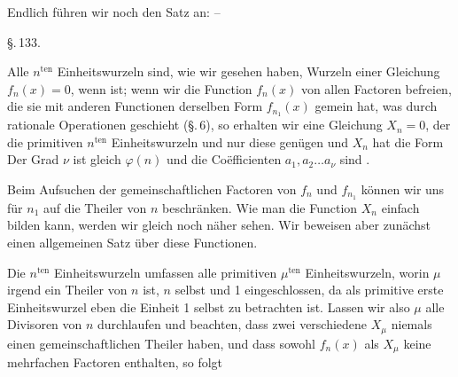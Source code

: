 
Endlich führen wir noch den Satz an: --


\begin{center}
\S.\,133.\\[0.3em]
\end{center}

Alle $n^{\text{ten}}$ Einheitswurzeln sind, wie wir gesehen haben, Wurzeln einer Gleichung $f_n(x) = 0$, wenn
ist; wenn wir die Function $f_n(x)$ von allen Factoren befreien, die sie mit anderen Functionen derselben Form $f_{n_1}(x)$ gemein hat, was durch rationale Operationen geschieht (\S.\,6), so erhalten wir eine Gleichung $X_n = 0$, der die primitiven $n^{\text{ten}}$ Einheitswurzeln und nur diese genügen und $X_n$ hat die Form
%
Der Grad $\nu$ ist gleich $\varphi(n)$ und die Co\"efficienten $a_1, a_2 \ldots a_\nu$ sind .

Beim Aufsuchen der gemeinschaftlichen Factoren von $f_n$ und $f_{n_1}$ können wir uns für $n_1$ auf die Theiler von $n$ beschränken. Wie man die Function $X_n$ einfach bilden kann, werden wir gleich noch näher sehen. Wir beweisen aber zunächst einen allgemeinen Satz über diese Functionen.

Die $n^{\text{ten}}$ Einheitswurzeln umfassen alle primitiven $\mu^{\text{ten}}$ Einheitswurzeln, worin $\mu$ irgend ein Theiler von $n$ ist, $n$ selbst und 1 eingeschlossen, da als primitive erste Einheitswurzel eben die Einheit 1 selbst zu betrachten ist. Lassen wir also $\mu$ alle Divisoren von $n$ durchlaufen und beachten, dass zwei verschiedene $X_\mu$ niemals einen gemeinschaftlichen Theiler haben, und dass sowohl $f_n(x)$ als $X_\mu$ keine mehrfachen Factoren enthalten, so folgt
